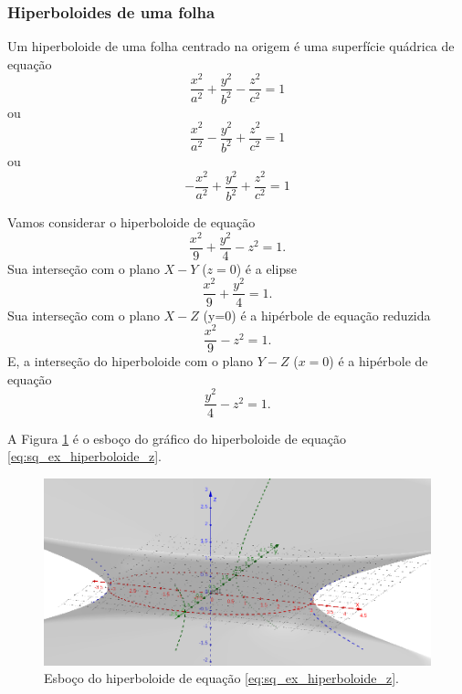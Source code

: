\subsubsection{Hiperboloides de uma folha}

Um hiperboloide de uma folha centrado na origem é uma superfície quádrica de equação
\begin{equation}
  \frac{x^2}{a^2}+\frac{y^2}{b^2}-\frac{z^2}{c^2}=1
\end{equation}
ou
\begin{equation}
  \frac{x^2}{a^2}-\frac{y^2}{b^2}+\frac{z^2}{c^2}=1
\end{equation}
ou
\begin{equation}
  -\frac{x^2}{a^2}+\frac{y^2}{b^2}+\frac{z^2}{c^2}=1
\end{equation}

\begin{ex}
  Vamos considerar o hiperboloide de equação
  \begin{equation}\label{eq:sq_ex_hiperboloide_z}
    \frac{x^2}{9}+\frac{y^2}{4}-z^2=1.
  \end{equation}
  Sua interseção com o plano $X-Y$ ($z=0$) é a elipse
  \begin{equation}
    \frac{x^2}{9}+\frac{y^2}{4}=1.
  \end{equation}
  Sua interseção com o plano $X-Z$ (y=0) é a hipérbole de equação reduzida
  \begin{equation}
    \frac{x^2}{9}-z^2=1.
  \end{equation}
  E, a interseção do hiperboloide com o plano $Y-Z$ ($x=0$) é a hipérbole de equação
  \begin{equation}
    \frac{y^2}{4}-z^2=1.
  \end{equation}
  
  A Figura \ref{fig:sq_ex_hiperboloide_z} é o esboço do gráfico do hiperboloide de equação \eqref{eq:sq_ex_hiperboloide_z}.

    \begin{figure}[H]
    \centering
    \includegraphics[width=\textwidth]{./cap_superquad/dados/fig_sq_ex_hiperboloide_z/fig}
    \caption{Esboço do hiperboloide de equação \eqref{eq:sq_ex_hiperboloide_z}.}
    \label{fig:sq_ex_hiperboloide_z}
  \end{figure}
\end{ex}

